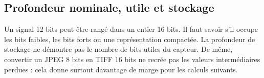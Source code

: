 \subsection{Profondeur nominale, utile et stockage}
Un signal 12 bits peut être rangé dans un entier 16 bits. Il faut
savoir s'il occupe les bits faibles, les bits forts ou une
représentation compactée. La profondeur de stockage ne démontre
pas le nombre de bits utiles du capteur. De même, convertir un
JPEG 8 bits en TIFF 16 bits ne recrée pas les valeurs intermédiaires
perdues : cela donne surtout davantage de marge pour les calculs suivants.

